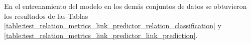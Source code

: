 \documentclass[a4paper,11pt,twocolumn,twoside]{article}
\begin{document}




En el entrenamiento del modelo en los demás conjuntos de datos se obtuvieron los resultados de las Tablas 
\ref{table:test_relation_metrics_link_predictor_relation_classification} y 
\ref{table:test_relation_metrics_link_predictor_link_prediction}.
\end{document}

